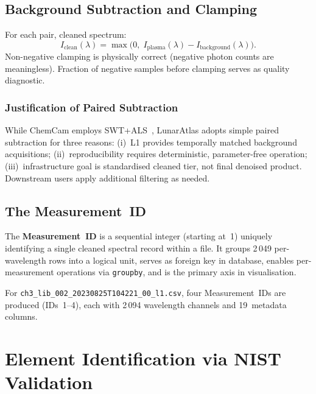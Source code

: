 \documentclass[a4paper,twocolumn,10pt]{article}
\begin{document}
\subsection{Background Subtraction and Clamping}

For each pair, cleaned spectrum:
\begin{equation}
\label{eq:subtraction}
I_{\text{clean}}(\lambda) =
  \max\!\bigl(0,\;
  I_{\text{plasma}}(\lambda) - I_{\text{background}}(\lambda)
  \bigr).
\end{equation}
Non-negative clamping is physically correct (negative photon counts
are meaningless). Fraction of negative samples before clamping serves
as quality diagnostic.

\subsubsection{Justification of Paired Subtraction}

While ChemCam employs SWT+ALS~\cite{Clegg2017,Anderson2022}, LunarAtlas
adopts simple paired subtraction for three reasons: (i)~L1 provides
temporally matched background acquisitions; (ii)~reproducibility requires
deterministic, parameter-free operation; (iii)~infrastructure goal is
standardised cleaned tier, not final denoised product. Downstream users
apply additional filtering as needed.

\subsection{The Measurement~ID}

The \textbf{Measurement~ID} is a sequential integer (starting at~1)
uniquely identifying a single cleaned spectral record within a file.
It groups 2\,049 per-wavelength rows into a logical unit, serves as
foreign key in database, enables per-measurement operations via
\texttt{groupby}, and is the primary axis in visualisation.

For \texttt{ch3\_lib\_002\_20230825T104221\_00\_l1.csv}, four
Measurement~IDs are produced (IDs~1--4), each with 2\,094 wavelength
channels and 19~metadata columns.

\section{Element Identification via NIST Validation}
\label{sec:element_id}
\end{document}
